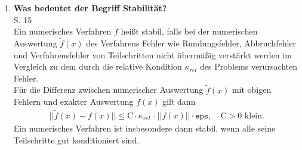 \begin{enumerate}
		\item \textbf{Was bedeutet der Begriff Stabilität?} \\
		S. 15\\
		Ein numerisches Verfahren \(f\) heißt stabil, falls bei der numerischen Auswertung \(\tilde{f}(x)\) des Verfahrens Fehler wie Rundungsfehler, Abbruchfehler und Verfahrensfehler von Teilschritten nicht	übermäßig verstärkt werden im Vergleich zu dem durch die relative Kondition \(\kappa_{rel}\) des Problems verursachten Fehler. \\
		Für die Differenz zwischen numerischer Auswertung \(\tilde{f}(x)\) mit obigen Fehlern und exakter Auswertung \(f(x)\) gilt dann
		\begin{align*}
			||\tilde{f}(x)-f(x)||\leq \text{C}\cdot\kappa_{rel.}\cdot||f(x)||\cdot\texttt{eps}, \quad \text{C} > 0 \text{ klein.}
		\end{align*}
		Ein numerisches Verfahren ist insbesondere dann stabil, wenn alle seine Teilschritte gut konditioniert sind.
		
	\end{enumerate}